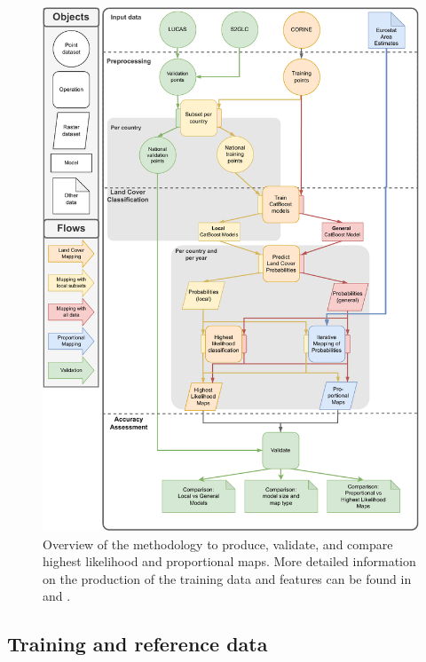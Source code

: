     \begin{figure}
    \centering
    \includegraphics[width=\linewidth]{figs_04/fig1_methodology.pdf}
    \caption{Overview of the methodology to produce, validate, and compare highest likelihood and proportional maps. More detailed information on the production of the training data and features can be found in \citep{witjes2022spatiotemporal} and \citep{witjes2023ecodatacube}.}
    \label{fig:workflow}
    \end{figure}
    
    \subsection{Training and reference data}
    
